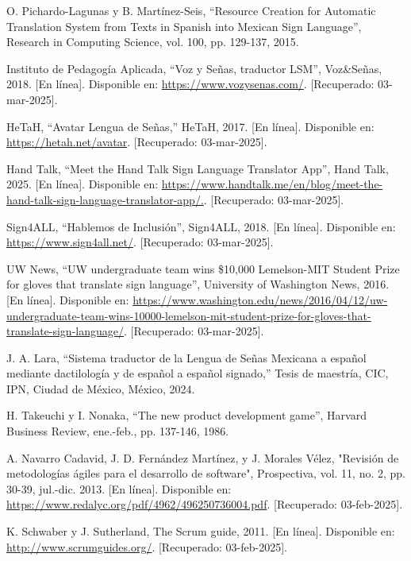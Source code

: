 \begin{thebibliography}{99}
    O. Pichardo-Lagunas y B. Martínez-Seis, “Resource Creation for Automatic Translation System from Texts in Spanish into Mexican Sign Language”, Research in Computing Science, vol. 100, pp. 129-137, 2015.

    Instituto de Pedagogía Aplicada, “Voz y Señas, traductor LSM”, Voz\&Señas, 2018. [En línea]. Disponible en: \url{https://www.vozysenas.com/}. [Recuperado: 03-mar-2025].

    HeTaH, “Avatar Lengua de Señas,” HeTaH, 2017. [En línea]. Disponible en: \url{https://hetah.net/avatar}. [Recuperado: 03-mar-2025].

    Hand Talk, “Meet the Hand Talk Sign Language Translator App”, Hand Talk, 2025. [En línea]. Disponible en: \url{https://www.handtalk.me/en/blog/meet-the-hand-talk-sign-language-translator-app/.}. [Recuperado: 03-mar-2025].

    Sign4ALL, “Hablemos de Inclusión”, Sign4ALL, 2018. [En línea]. Disponible en: \url{https://www.sign4all.net/}. [Recuperado: 03-mar-2025].

    UW News, “UW undergraduate team wins \$10,000 Lemelson-MIT Student Prize for gloves that translate sign language”, University of Washington News, 2016. [En línea]. Disponible en: \url{https://www.washington.edu/news/2016/04/12/uw-undergraduate-team-wins-10000-lemelson-mit-student-prize-for-gloves-that-translate-sign-language/}. [Recuperado: 03-mar-2025].

    J. A. Lara, “Sistema traductor de la Lengua de Señas Mexicana a español mediante dactilología y de español a español signado,” Tesis de maestría, CIC, IPN, Ciudad de México, México, 2024.

    H. Takeuchi y I. Nonaka, “The new product development game”, Harvard Business Review, ene.-feb., pp. 137-146, 1986.

    A. Navarro Cadavid, J. D. Fernández Martínez, y J. Morales Vélez, "Revisión de metodologías ágiles para el desarrollo de software", Prospectiva, vol. 11, no. 2, pp. 30-39, jul.-dic. 2013. [En línea]. Disponible en: \url{https://www.redalyc.org/pdf/4962/496250736004.pdf}. [Recuperado: 03-feb-2025].

    K. Schwaber y J. Sutherland, The Scrum guide, 2011. [En línea]. Disponible en: \url{http://www.scrumguides.org/}. [Recuperado: 03-feb-2025].

\end{thebibliography}